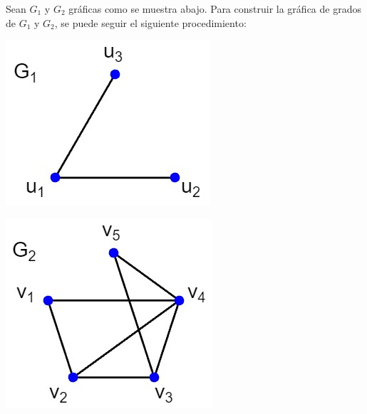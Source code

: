 \documentclass[fleqn, 11pt]{article}
\begin{document}
    \begin{ejemplo}[breakable, pad at break = 4mm, beforeafter skip = 3mm]{}{}
        Sean $ G_1 $ y $ G_2 $ gráficas como se muestra abajo. Para construir la gráfica de grados de $ G_1 $ y $ G_2 $, se puede seguir el siguiente procedimiento: \vspace{3mm}

        \begin{center}
            \begin{minipage}[h]{0.3\linewidth}
                \includegraphics[width=0.9\linewidth]{Ejemplo_1/Ejemplo1_G1.jpg}
            \end{minipage} \hspace{0.1\linewidth}
            \begin{minipage}[h]{0.3\linewidth}
                \includegraphics[width=0.9\linewidth]{Ejemplo_1/Ejemplo1_G2.jpg}
            \end{minipage}
        \end{center} \vspace{3mm}


\end{ejemplo}
\end{document}
